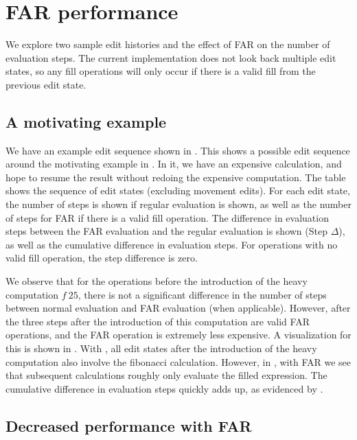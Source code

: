 \section{FAR performance}
\label{sec:evaluation-far}

We explore two sample edit histories and the effect of FAR on the number of evaluation steps. The current implementation does not look back multiple edit states, so any fill operations will only occur if there is a valid fill from the previous edit state.

\subsection{A motivating example}
\label{sec:eval-far-motivating}

We have an example edit sequence shown in . This shows a possible edit sequence around the motivating example in . In it, we have an expensive calculation, and hope to resume the result without redoing the expensive computation. The table shows the sequence of edit states (excluding movement edits). For each edit state, the number of steps is shown if regular evaluation is shown, as well as the number of steps for FAR if there is a valid fill operation. The difference in evaluation steps between the FAR evaluation and the regular evaluation is shown (Step $\Delta$), as well as the cumulative difference in evaluation steps. For operations with no valid fill operation, the step difference is zero.

We observe that for the operations before the introduction of the heavy computation $f\ 25$, there is not a significant difference in the number of steps between normal evaluation and FAR evaluation (when applicable). However, after the three steps after the introduction of this computation are valid FAR operations, and the FAR operation is extremely less expensive. A visualization for this is shown in . With , all edit states after the introduction of the heavy computation also involve the fibonacci calculation. However, in , with FAR we see that subsequent calculations roughly only evaluate the filled expression. The cumulative difference in evaluation steps quickly adds up, as evidenced by .

\subsection{Decreased performance with FAR}
\label{sec:eval-far-decreased}

